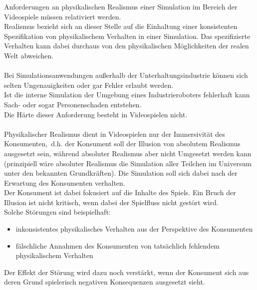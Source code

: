\label{sec:physical_realism}
Anforderungen an physikalischen Realismus einer Simulation im Bereich der Videospiele müssen relativiert werden.\\
Realismus bezieht sich an dieser Stelle auf die Einhaltung einer konsistenten Spezifikation von physikalischem Verhalten in einer Simulation. Das spezifizierte Verhalten kann dabei durchaus von den physikalischen Möglichkeiten der realen Welt abweichen.\\
\\
Bei Simulationsanwendungen außerhalb der Unterhaltungsindustrie können sich selten Ungenauigkeiten oder gar Fehler erlaubt werden.\\
Ist die interne Simulation der Umgebung eines Industrieroboters fehlerhaft kann Sach- oder sogar Personenschaden entstehen.\\
Die Härte dieser Anforderung besteht in Videospielen nicht.\\
\\
Physikalischer Realismus dient in Videospielen nur der Immersivität des Konsumenten,~d.h. der Konsument soll der Illusion von absolutem Realismus ausgesetzt sein, während absoluter Realismus aber nicht Umgesetzt werden kann (prinzipiell wäre absoluter Realismus die Simulation aller Teilchen im Universum unter den bekannten Grundkräften). Die Simulation soll sich dabei nach der Erwartung des Konsumenten verhalten.\\
Der Konsument ist dabei fokusiert auf die Inhalte des Spiels. Ein Bruch der Illusion ist nicht kritisch, wenn dabei der Spielfluss nicht gestört wird.\\
Solche Störungen sind beispielhaft:
\begin{itemize}
	\item inkonsistentes physikalisches Verhalten aus der Perspektive des Konsumenten
	\item fälschliche Annahmen des Konsumenten von tatsächlich fehlendem physikalischem Verhalten
\end{itemize}
Der Effekt der Störung wird dazu noch verstärkt, wenn der Konsument sich aus deren Grund spielerisch negativen Konsequenzen ausgesetzt sieht.\\


